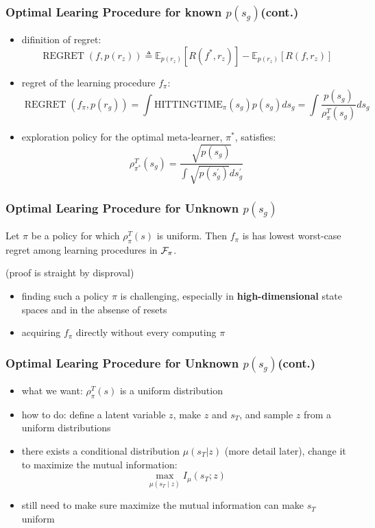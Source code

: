 \documentclass[aspectratio=169]{beamer}
\begin{document}
\begin{frame}
  \frametitle{Optimal Learing Procedure for known $p(s_g)$(cont.)}
  \begin{itemize}
    \item difinition of regret: \\
    $$\operatorname{REGRET}\left(f, p\left(r_{z}\right)\right) \triangleq \mathbb{E}_{p\left(r_{z}\right)}\left[R\left(f^{*}, r_{z}\right)\right]-\mathbb{E}_{p\left(r_{z}\right)}\left[R\left(f, r_{z}\right)\right]$$
    \item regret of the learning procedure $f_\pi$:\\
    $$\operatorname{REGRET}\left(f_{\pi}, p\left(r_{g}\right)\right)=\int\mathrm{HITTINGTIME}_{\pi}\left(s_{g}\right) p\left(s_{g}\right) d s_{g}=\int \frac{p\left(s_{g}\right)}{\rho_{\pi}^{T}\left(s_{g}\right)} d s_{g}$$
    \item exploration policy for the optimal meta-learner, $\pi^*$, satisfies: \\
    $$\rho_{\pi^{*}}^{T}\left(s_{g}\right)=\frac{\sqrt{p\left(s_{g}\right)}}{\int \sqrt{p\left(s_{g}^{\prime}\right)} d s_{g}^{\prime}}$$
  \end{itemize}
\end{frame}

\begin{frame}
  \frametitle{Optimal Learing Procedure for Unknown $p(s_g)$}
  \begin{lemma} \label{lemma:uniform}
    Let $\pi$ be a policy for which $\rho_\pi^T(s)$ is uniform. Then $f_\pi$ is has lowest worst-case regret among learning procedures in ${\mathcal{F}}_\pi$.
  \end{lemma}
  (proof is straight by disproval)

  \begin{itemize}
    \item finding such a policy $\pi$ is challenging, especially in \textbf{high-dimensional} state spaces and in the absense of resets
    \item acquiring $f_\pi$ directly without every computing $\pi$
  \end{itemize}
\end{frame}

\begin{frame}
  \frametitle{Optimal Learing Procedure for Unknown $p(s_g)$(cont.)}
  \begin{itemize}
    \item what we want: $\rho_\pi^T(s)$ is a uniform distribution
    \item how to do: define a latent variable $z$, make $z$ and $s_T$, and sample $z$ from a uniform distributions
    \item there exists a conditional distribution $\mu(s_T | z)$ (more detail later), change it to maximize the mutual information:\\
    $$\max _{\mu\left(s_{T} \mid z\right)} I_{\mu}\left(s_{T} ; z\right)$$
    \item still need to make sure maximize the mutual information can make $s_T$ uniform
  \end{itemize}
\end{frame}
\end{document}
